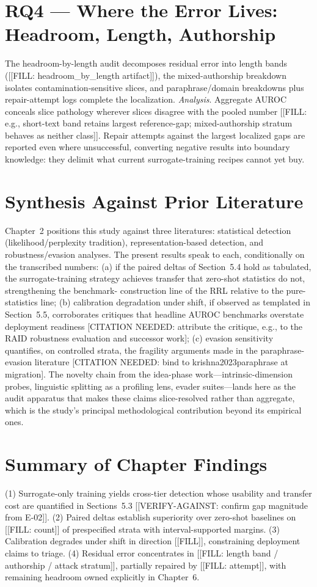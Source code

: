 \section{RQ4 --- Where the Error Lives: Headroom, Length, Authorship}
The headroom-by-length audit decomposes residual error into length bands
([[FILL: headroom\_by\_length artifact]]), the mixed-authorship breakdown
isolates contamination-sensitive slices, and paraphrase/domain breakdowns
plus repair-attempt logs complete the localization.
\emph{Analysis}. Aggregate AUROC conceals slice pathology wherever slices
disagree with the pooled number [[FILL: e.g., short-text band retains
largest reference-gap; mixed-authorship stratum behaves as neither
class]]. Repair attempts against the largest localized gaps are reported
even where unsuccessful, converting negative results into boundary
knowledge: they delimit what current surrogate-training recipes cannot
yet buy.

\section{Synthesis Against Prior Literature}
Chapter~2 positions this study against three literatures: statistical
detection (likelihood/perplexity tradition), representation-based
detection, and robustness/evasion analyses. The present results speak to
each, conditionally on the transcribed numbers: (a) if the paired deltas
of Section~5.4 hold as tabulated, the surrogate-training strategy achieves
transfer that zero-shot statistics do not, strengthening the benchmark-
construction line of the RRL relative to the pure-statistics line;
(b) calibration degradation under shift, if observed as templated in
Section~5.5, corroborates critiques that headline AUROC benchmarks
overstate deployment readiness [CITATION NEEDED: attribute the critique,
e.g., to the RAID robustness evaluation and successor work]; (c) evasion
sensitivity quantifies, on controlled strata, the fragility arguments made
in the paraphrase-evasion literature [CITATION NEEDED: bind to
krishna2023paraphrase at migration]. The novelty chain from the idea-phase
work---intrinsic-dimension probes, linguistic splitting as a profiling
lens, evader suites---lands here as the audit apparatus that makes these
claims slice-resolved rather than aggregate, which is the study's
principal methodological contribution beyond its empirical ones.

\section{Summary of Chapter Findings}
(1) Surrogate-only training yields cross-tier detection whose usability
and transfer cost are quantified in Sections~5.3 [[VERIFY-AGAINST: confirm
gap magnitude from E-02]]. (2) Paired deltas establish superiority over
zero-shot baselines on [[FILL: count]] of prespecified strata with
interval-supported margins. (3) Calibration degrades under shift in
direction [[FILL]], constraining deployment claims to triage. (4) Residual
error concentrates in [[FILL: length band / authorship / attack stratum]],
partially repaired by [[FILL: attempt]], with remaining headroom owned
explicitly in Chapter~6.